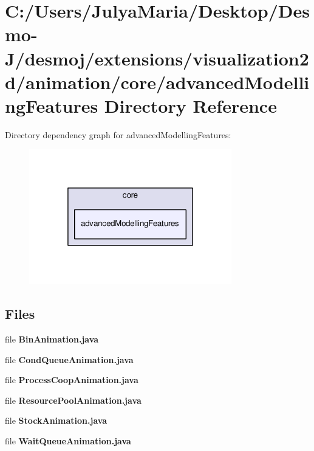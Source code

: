 \section{C\-:/\-Users/\-Julya\-Maria/\-Desktop/\-Desmo-\/\-J/desmoj/extensions/visualization2d/animation/core/advanced\-Modelling\-Features Directory Reference}
\label{dir_8e4352d2f619d26dff92eeca897351c4}
Directory dependency graph for advanced\-Modelling\-Features\-:
\nopagebreak
\begin{figure}[H]
\begin{center}
\leavevmode
\includegraphics[width=250pt]{dir_8e4352d2f619d26dff92eeca897351c4_dep}
\end{center}
\end{figure}
\subsection*{Files}
\begin{DoxyCompactItemize}
\item 
file {\bfseries Bin\-Animation.\-java}
\item 
file {\bfseries Cond\-Queue\-Animation.\-java}
\item 
file {\bfseries Process\-Coop\-Animation.\-java}
\item 
file {\bfseries Resource\-Pool\-Animation.\-java}
\item 
file {\bfseries Stock\-Animation.\-java}
\item 
file {\bfseries Wait\-Queue\-Animation.\-java}
\end{DoxyCompactItemize}
